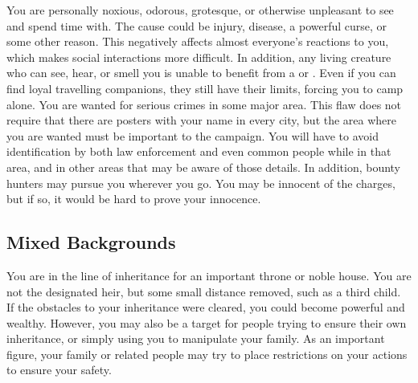      You are personally noxious, odorous, grotesque, or otherwise unpleasant to see and spend time with.
    The cause could be injury, disease, a powerful curse, or some other reason.
    This negatively affects almost everyone's reactions to you, which makes social interactions more difficult.
    In addition, any living creature who can see, hear, or smell you is unable to benefit from a  or .
    Even if you can find loyal travelling companions, they still have their limits, forcing you to camp alone.
     You are wanted for serious crimes in some major area.
    This flaw does not require that there are posters with your name in every city, but the area where you are wanted must be important to the campaign.
    You will have to avoid identification by both law enforcement and even common people while in that area, and in other areas that may be aware of those details.
    In addition, bounty hunters may pursue you wherever you go.
    You may be innocent of the charges, but if so, it would be hard to prove your innocence.

  \subsection{Mixed Backgrounds}
     You are in the line of inheritance for an important throne or noble house.
    You are not the designated heir, but some small distance removed, such as a third child.
    If the obstacles to your inheritance were cleared, you could become powerful and wealthy.
    However, you may also be a target for people trying to ensure their own inheritance, or simply using you to manipulate your family.
    As an important figure, your family or related people may try to place restrictions on your actions to ensure your safety.



